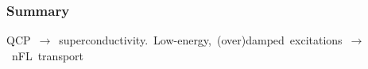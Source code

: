 

\begin{frame}[plain]
\frametitle{Summary}
  \mbox{\small QCP $\rightarrow$ superconductivity. Low-energy, (over)damped excitations $\rightarrow$ nFL transport}
\end{frame}


